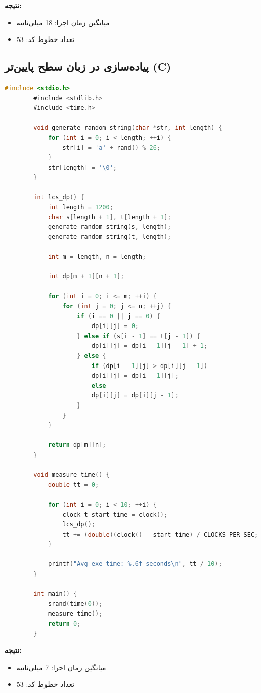 \documentclass[12pt, a4paper]{report}
\begin{document}
\textbf{نتیجه:}
\begin{itemize}
	\item میانگین زمان اجرا: \textnormal{18} میلی‌ثانیه
	\item تعداد خطوط کد: \textnormal{53}
\end{itemize}


\subsection{پیاده‌سازی در زبان سطح پایین‌تر (C)}

\begin{LTR}
	\begin{lstlisting}[language=C, breaklines=true]
		#include <stdio.h>
		#include <stdlib.h>
		#include <time.h>
		
		void generate_random_string(char *str, int length) {
			for (int i = 0; i < length; ++i) {
				str[i] = 'a' + rand() % 26;
			}
			str[length] = '\0';
		}
		
		int lcs_dp() {
			int length = 1200;
			char s[length + 1], t[length + 1];
			generate_random_string(s, length);
			generate_random_string(t, length);
			
			int m = length, n = length;
			
			int dp[m + 1][n + 1];
			
			for (int i = 0; i <= m; ++i) {
				for (int j = 0; j <= n; ++j) {
					if (i == 0 || j == 0) {
						dp[i][j] = 0;
					} else if (s[i - 1] == t[j - 1]) {
						dp[i][j] = dp[i - 1][j - 1] + 1;
					} else {
						if (dp[i - 1][j] > dp[i][j - 1]) 
						dp[i][j] = dp[i - 1][j];
						else 
						dp[i][j] = dp[i][j - 1];
					}
				}
			}
			
			return dp[m][n];
		}
		
		void measure_time() {
			double tt = 0;
			
			for (int i = 0; i < 10; ++i) {
				clock_t start_time = clock();
				lcs_dp();
				tt += (double)(clock() - start_time) / CLOCKS_PER_SEC;
			}
			
			printf("Avg exe time: %.6f seconds\n", tt / 10);
		}
		
		int main() {
			srand(time(0));
			measure_time();
			return 0;
		}
	\end{lstlisting}
\end{LTR}


\textbf{نتیجه:}
\begin{itemize}
	\item میانگین زمان اجرا: \textnormal{7} میلی‌ثانیه
	\item تعداد خطوط کد: \textnormal{53}
\end{itemize}
\end{document}
